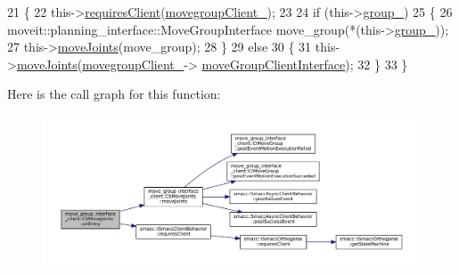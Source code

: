 \begin{DoxyCode}
21   \{
22     this->\hyperlink{classsmacc_1_1ISmaccClientBehavior_a32b16e99e3b4cb289414203dc861a440}{requiresClient}(\hyperlink{classmove__group__interface__client_1_1CbMoveJoints_a9c1ffe89b25fc5693949241217d73e90}{movegroupClient\_});
23 
24     \textcolor{keywordflow}{if} (this->\hyperlink{classmove__group__interface__client_1_1CbMoveJoints_aed3fff5331aa947ec89c55945bae1afc}{group\_})
25     \{
26       moveit::planning\_interface::MoveGroupInterface move\_group(*(this->\hyperlink{classmove__group__interface__client_1_1CbMoveJoints_aed3fff5331aa947ec89c55945bae1afc}{group\_}));
27       this->\hyperlink{classmove__group__interface__client_1_1CbMoveJoints_aa60670293a8fafcb6e091b85af722822}{moveJoints}(move\_group);
28     \}
29     \textcolor{keywordflow}{else}
30     \{
31       this->\hyperlink{classmove__group__interface__client_1_1CbMoveJoints_aa60670293a8fafcb6e091b85af722822}{moveJoints}(\hyperlink{classmove__group__interface__client_1_1CbMoveJoints_a9c1ffe89b25fc5693949241217d73e90}{movegroupClient\_}->
      \hyperlink{classmove__group__interface__client_1_1ClMoveGroup_a5f0ea9b52695661b17605691168d1f31}{moveGroupClientInterface});
32     \}
33   \}
\end{DoxyCode}
Here is the call graph for this function\+:
\nopagebreak
\begin{figure}[H]
\begin{center}
\leavevmode
\includegraphics[width=350pt]{classmove__group__interface__client_1_1CbMoveJoints_af1e51367bb28be09704ab3747afff1f1_cgraph}
\end{center}
\end{figure}
\mbox{\label{classmove__group__interface__client_1_1CbMoveJoints_ac797c81d4a17c11e224553d9c231fe9f}} 
